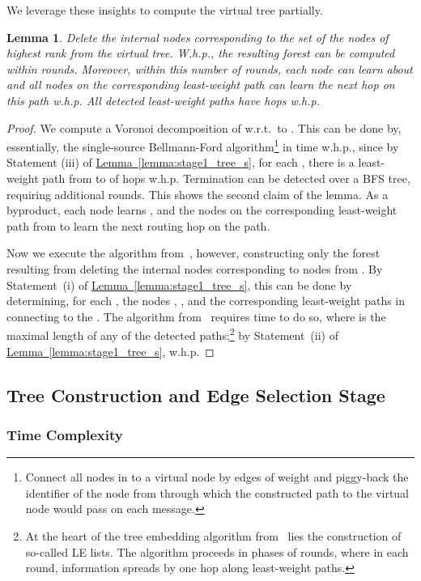 \documentclass[letterpaper,11pt]{article}
\newtheorem{lemma}[theorem]{Lemma}
\newcommand{\namedref}[2]{\hyperref[#2]{#1~\ref*{#2}}}
\newcommand{\lemmaref}[1]{\namedref{Lemma}{#1}}
\begin{document}
We leverage these insights to compute the virtual tree partially.
\begin{lemma}\label{lemma:stage1_partial}
Delete the internal nodes corresponding to the set  of the 
nodes of highest rank from the virtual tree. W.h.p., the resulting forest can be
computed within  rounds. Moreover, within this number
of rounds, each node  can learn about
 and all nodes on the corresponding least-weight path can learn
the next hop on this path w.h.p. All detected least-weight paths have
 hops w.h.p.
\end{lemma}
\begin{proof}
We compute a Voronoi decomposition of  w.r.t.\ to . This can be
done by, essentially, the single-source Bellmann-Ford algorithm\footnote{Connect
all nodes in  to a virtual node by edges of weight  and piggy-back
the identifier of the node from  through which the constructed path to
the virtual node would pass on each message.} in time 
w.h.p., since by Statement (iii) of \lemmaref{lemma:stage1_tree_s}, for each
, there is a least-weight path from  to  of  hops w.h.p. Termination can be detected
over a BFS tree, requiring additional  rounds. This shows the second
claim of the lemma. As a byproduct, each node  learns ,
and the nodes on the corresponding least-weight path from  to
 learn the next routing hop on the path.

Now we execute the algorithm from~\cite{KKMPT-12}, however, constructing only
the forest resulting from deleting the internal nodes corresponding to nodes
from . By Statement~(i) of \lemmaref{lemma:stage1_tree_s}, this can be
done by determining, for each , the nodes ,
, and the corresponding least-weight paths in 
connecting  to the . The algorithm from~\cite{KKMPT-12} requires time
 to do so, where  is the maximal length of
any of the detected paths;\footnote{At the heart of the tree embedding algorithm
from~\cite{KKMPT-12} lies the construction of so-called LE lists. The algorithm
proceeds in phases of  rounds, where in each round, information
spreads by one hop along least-weight paths.} by Statement~(ii) of
\lemmaref{lemma:stage1_tree_s},  w.h.p.
\end{proof}


\subsection{Tree Construction and Edge Selection
Stage}\label{sec:tree_selection}

\subsubsection*{Time Complexity}
\end{document}
